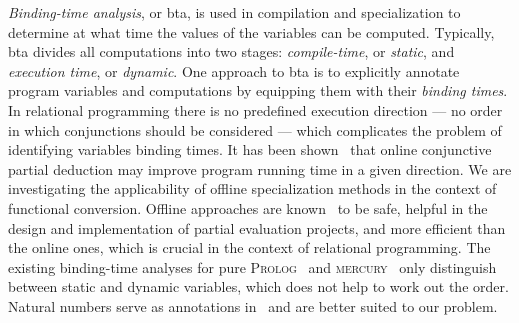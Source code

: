 \documentclass[submission,copyright,creativecommons]{eptcs}
\newcommand{\prolog}{\textsc{Prolog}}
\newcommand{\mercury}{\textsc{mercury}}
\begin{document}
\emph{Binding-time analysis}, or bta, is used in compilation and specialization to determine at what time the values of the variables can be computed.
Typically, bta divides all computations into two stages: \emph{compile-time}, or \emph{static}, and \emph{execution time}, or \emph{dynamic}.
One approach to bta is to explicitly annotate program variables and computations by equipping them with their \emph{binding times}.
In relational programming there is no predefined execution direction --- no order in which conjunctions should be considered ---
which complicates the problem of identifying variables binding times.
It has been shown~\cite{lozov2019relational} that online conjunctive partial deduction may improve program running time in a given direction.
We are investigating the applicability of offline specialization methods in the context of functional conversion.
Offline approaches are known~\cite{jones1993partial} to be safe, helpful in the design and implementation of partial evaluation projects, and more efficient than the online ones, which is crucial in the context of relational programming.
The existing binding-time analyses for pure \prolog{}~\cite{craig2004fully} and \mercury{}~\cite{vanhoof2004binding} only distinguish between static and dynamic variables, which does not help to work out the order.
Natural numbers serve as annotations in~\cite{Thiemann1997AUF} and are better suited to our problem.


\end{document}
